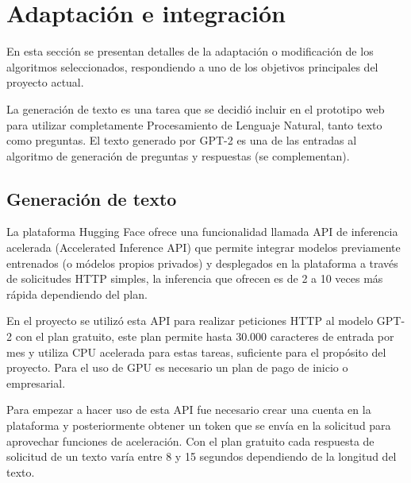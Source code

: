 \documentclass[../Main.tex]{subfiles}
\begin{document}
    \section{Adaptación e integración}
        \begin{justify}
        En esta sección se presentan detalles de la adaptación o modificación de los algoritmos seleccionados, respondiendo a uno de los objetivos principales del proyecto actual.
        
        La generación de texto es una tarea que se decidió incluir en el prototipo web para utilizar completamente Procesamiento de Lenguaje Natural, tanto texto como preguntas.
        El texto generado por GPT-2 es una de las entradas al algoritmo de generación de preguntas y respuestas (se complementan).
        \end{justify}
    
        \subsection{Generación de texto}
            \begin{justify}
            La plataforma Hugging Face ofrece una funcionalidad llamada API de inferencia acelerada (Accelerated Inference API) que permite integrar modelos previamente entrenados (o módelos propios privados) y desplegados en la plataforma a través de solicitudes HTTP simples, la inferencia que ofrecen es de 2 a 10 veces más rápida dependiendo del plan.
            
            En el proyecto se utilizó esta API para realizar peticiones HTTP al modelo GPT-2 con el plan gratuito, este plan permite hasta 30.000 caracteres de entrada por mes y utiliza CPU acelerada para estas tareas, suficiente para el propósito del proyecto. Para el uso de GPU es necesario un plan de pago de inicio o empresarial.
            
            Para empezar a hacer uso de esta API fue necesario crear una cuenta en la plataforma y posteriormente obtener un token que se envía en la solicitud para aprovechar funciones de aceleración.
            Con el plan gratuito cada respuesta de solicitud de un texto varía entre 8 y 15 segundos dependiendo de la longitud del texto.
            \end{justify}
            
\end{document}
